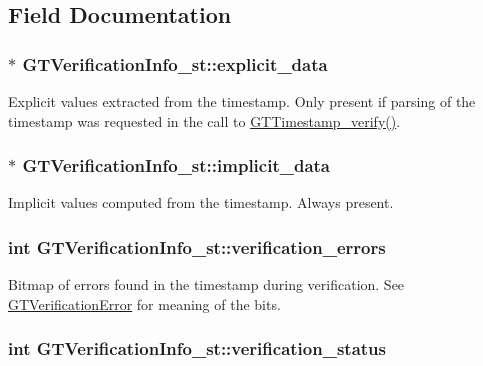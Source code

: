 \subsection{Field Documentation}
\hypertarget{struct_g_t_verification_info__st_ac01008ee2f1698ba06125490912c8eac}{
\subsubsection[{explicit\_\-data}]{$\ast$ {\bf GTVerificationInfo\_\-st::explicit\_\-data}}}
\label{struct_g_t_verification_info__st_ac01008ee2f1698ba06125490912c8eac}
Explicit values extracted from the timestamp. Only present if parsing of the timestamp was requested in the call to \hyperlink{group__verification_gabb2faaa480064b6aad83582b80aa2c53}{GTTimestamp\_\-verify()}. \hypertarget{struct_g_t_verification_info__st_a88ab8f11b10eef254f0a2b7fcec13c40}{
\subsubsection[{implicit\_\-data}]{$\ast$ {\bf GTVerificationInfo\_\-st::implicit\_\-data}}}
\label{struct_g_t_verification_info__st_a88ab8f11b10eef254f0a2b7fcec13c40}
Implicit values computed from the timestamp. Always present. \hypertarget{struct_g_t_verification_info__st_aeb572fb192cf7e67a573d8fbd924a3dd}{
\subsubsection[{verification\_\-errors}]{\setlength{\rightskip}{0pt plus 5cm}int {\bf GTVerificationInfo\_\-st::verification\_\-errors}}}
\label{struct_g_t_verification_info__st_aeb572fb192cf7e67a573d8fbd924a3dd}
Bitmap of errors found in the timestamp during verification. See \hyperlink{group__verification_ga00f17574800248075712b4aa9a3faf93}{GTVerificationError} for meaning of the bits. \hypertarget{struct_g_t_verification_info__st_a9c1f6171361e1bd9b4c19b9d7152dd0c}{
\subsubsection[{verification\_\-status}]{\setlength{\rightskip}{0pt plus 5cm}int {\bf GTVerificationInfo\_\-st::verification\_\-status}}}
